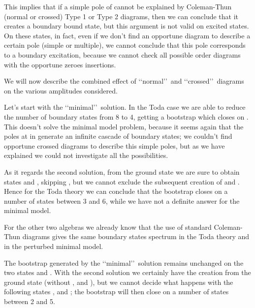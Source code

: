 \documentclass[a4paper,12pt]{report}
\begin{document}
This implies that if a simple pole of \coordHE{} cannot be explained by Coleman-Thun (normal or crossed) Type 1
or Type 2 diagrams, then we can conclude that it creates a boundary bound state, but this argument is not valid
on excited states. On these states, in fact, even if we don't find an opportune diagram to describe a certain pole
(simple or multiple), we cannot conclude that this pole corresponds to a boundary excitation, because we cannot
check all possible order diagrams with the opportune zeroes insertions.

\vspace{0.5cm}

We will now describe the combined effect of \lq\lq normal\rq\rq \, and \lq\lq crossed\rq\rq \, diagrams on the
various amplitudes considered.

\vspace{0.5cm}

Let's start with the \coordHE{} \lq\lq minimal\rq\rq \, solution. In the Toda case we are able to reduce the number
of boundary states from 8 to 4, getting a bootstrap which closes on \coordHE{}. This doesn't
solve the minimal model problem, because it seems again that the poles at \coordHE{} in
\coordHE{} generate an infinite cascade of boundary states; we couldn't find opportune crossed
diagrams to describe this simple poles, but as we have explained we could not investigate all the possibilities.

As it regards the second solution, from the ground state we are sure to obtain states \myHighlight{$\beta$}\coordHE{} and \myHighlight{$\gamma$}\coordHE{},
skipping \coordHE{}, but we cannot exclude the subsequent creation of \coordHE{} and \myHighlight{$\varepsilon$}\coordHE{}. Hence
for the Toda theory we can conclude that the bootstrap closes on a number of states between 3 and 6, while we
have not a definite answer for the minimal model.

\vspace{0.5cm}

For the other two algebras we already know that the use of standard Coleman-Thun diagrams gives the same boundary
states spectrum in the Toda theory and in the perturbed minimal model.

The bootstrap generated by the \coordHE{} \lq\lq minimal\rq\rq \, solution remains unchanged on the two states \coordHE{}
and \myHighlight{$\alpha$}\coordHE{}. With the second solution we certainly have the \myHighlight{$\delta$}\coordHE{} creation from the ground state (without
\myHighlight{$\alpha$}\coordHE{}, \myHighlight{$\beta$}\coordHE{} and \myHighlight{$\gamma$}\coordHE{}), but we cannot decide what happens with the following states \myHighlight{$\varepsilon$}\coordHE{},
\myHighlight{$\sigma$}\coordHE{} and \myHighlight{$\tau$}\coordHE{}; the bootstrap will then close on a number of states between 2 and 5.
\end{document}
